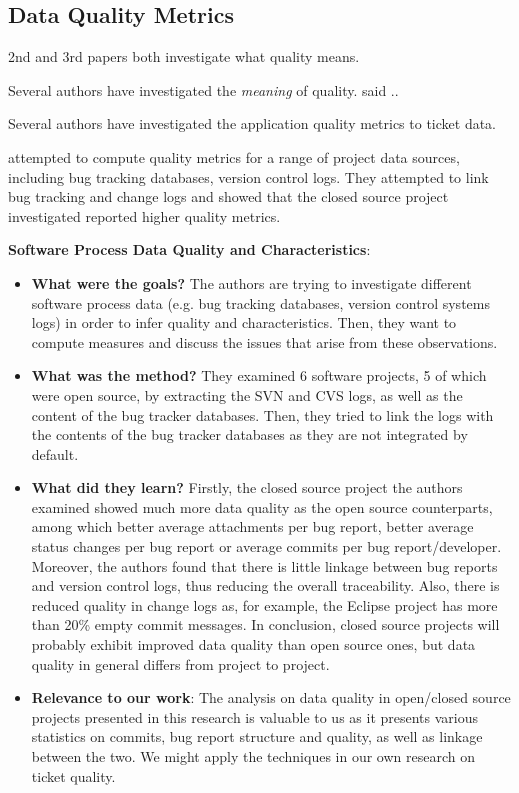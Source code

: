 \documentclass{mprop}
\begin{document}
\subsection{Data Quality Metrics}

2nd and 3rd papers both investigate what quality means.

Several authors have investigated the \emph{meaning} of quality.   \cite{sucansuch2018} said ..

Several authors have investigated the application quality metrics to ticket data.

\citet{bachmann2009software} attempted to compute quality metrics for a range of project data sources, including bug tracking databases, version control logs.  They attempted to link bug tracking and change logs and showed that the closed source project investigated reported higher quality metrics.

\citet{}

\textbf{Software Process Data Quality and Characteristics}\cite{bachmann2009software}:
\begin{itemize}
  \item \textbf{What were the goals?}
    The authors are trying to investigate different software process data
    (e.g. bug tracking databases, version control systems logs) in order to
    infer quality and characteristics. Then, they want to compute measures
    and discuss the issues that arise from these observations.
  \item \textbf{What was the method?}
    They examined 6 software projects, 5 of which were open source, by extracting
    the SVN and CVS logs, as well as the content of the bug tracker databases. Then,
    they tried to link the logs with the contents of the bug tracker databases as they
    are not integrated by default. 
  \item \textbf{What did they learn?}
    Firstly, the closed source project the authors examined showed much more data
    quality as the open source counterparts, among which better average attachments 
    per bug report, better average status changes per bug report or average commits
    per bug report/developer. Moreover, the authors found that there is little linkage
    between bug reports and version control logs, thus reducing the overall traceability.
    Also, there is reduced quality in change logs as, for example, the Eclipse project
    has more than 20\% empty commit messages. In conclusion, closed source projects will
    probably exhibit improved data quality than open source ones, but data quality in general
    differs from project to project.
  \item \textbf{Relevance to our work}:
    The analysis on data quality in open/closed source projects presented in this 
    research is valuable to us as it presents various statistics on commits, bug report
    structure and quality, as well as linkage between the two. We might apply the techniques
    in our own research on ticket quality.
\end{itemize}
\end{document}
